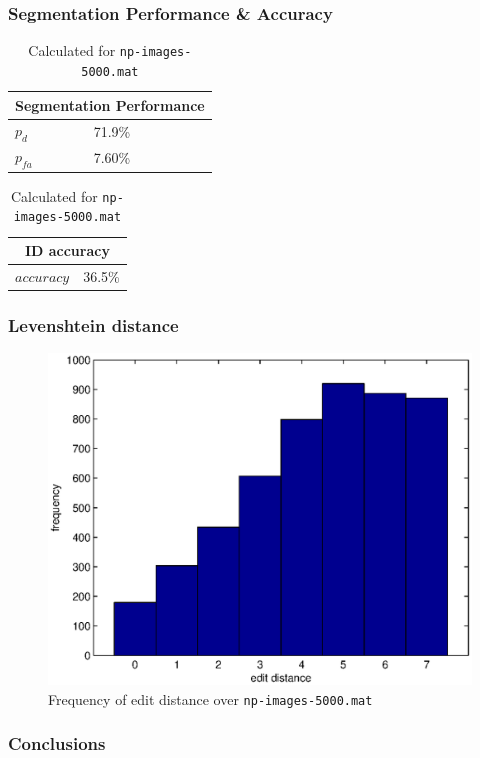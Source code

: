 \documentclass{beamer}
\begin{document}
\begin{frame}
  \frametitle{Segmentation Performance \& Accuracy}
  
  \begin{table}[ht]
\begin{center}
\begin{tabular}{|l|l|}
  \hline
  \multicolumn{2}{|c|}{Segmentation Performance} \\
  \hline
  $p_d$ & 71.9\% \\
  $p_{fa}$ & 7.60\% \\
  \hline
\end{tabular}
\caption{Calculated for \texttt{np-images-5000.mat}}
\label{table:segmentation}
\end{center}
\end{table}

\begin{table}[ht]
\begin{center}
\begin{tabular}{|l|l|}
  \hline
  \multicolumn{2}{|c|}{ID accuracy} \\
  \hline
  $accuracy$ & 36.5\% \\
  \hline
\end{tabular}
\caption{Calculated for \texttt{np-images-5000.mat}}
\end{center}
\end{table} 
  
\end{frame}

\begin{frame}
  \frametitle{Levenshtein distance}
  \begin{figure}
\begin{center}
\includegraphics[width=0.75\linewidth]{pics/hamming.eps}
\caption{ Frequency of edit distance over \texttt{np-images-5000.mat}  } 
\label{fig:editdistance}
\end{center}
\end{figure}
\end{frame}

\begin{frame}
  \frametitle{Conclusions}
\end{frame}
\end{document}
